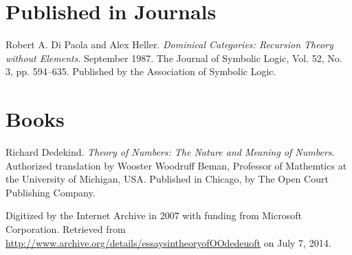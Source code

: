 \begin{thebibliography}{9} %

\label{sec:references}

\section*{Published in Journals}









Robert A. Di Paola and Alex Heller. \emph{Dominical Categories: Recursion
Theory without Elements}. September 1987. The Journal of Symbolic Logic, Vol.
52, No. 3, pp.  594--635. Published by the Association of Symbolic Logic.

\backrefprint

\section*{Books}


Richard Dedekind. \emph{Theory of Numbers: The Nature and Meaning of Numbers}.
Authorized translation by Wooster Woodruff Beman, Professor of Mathemtics at
the University of Michigan, USA. Published in Chicago, by The Open Court
Publishing Company.

Digitized by the Internet Archive in 2007 with funding from Microsoft
Corporation. Retrieved from
\url{http://www.archive.org/details/essaysintheoryofOOdedeuoft} on July 7,
2014.


\end{thebibliography}
